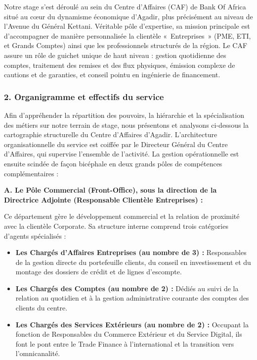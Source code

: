 Notre stage s'est déroulé au sein du Centre d'Affaires (CAF) de Bank Of Africa situé au c\oe{}ur du dynamisme économique d'Agadir, plus précisément au niveau de l'Avenue du Général Kettani. Véritable pôle d'expertise, sa mission principale est d'accompagner de manière personnalisée la clientèle «~Entreprises~» (PME, ETI, et Grands Comptes) ainsi que les professionnels structurés de la région. Le CAF assure un rôle de guichet unique de haut niveau : gestion quotidienne des comptes, traitement des remises et des flux physiques, émission complexe de cautions et de garanties, et conseil pointu en ingénierie de financement.

\subsubsection*{2. Organigramme et effectifs du service}

Afin d'appréhender la répartition des pouvoirs, la hiérarchie et la spécialisation des métiers sur notre terrain de stage, nous présentons et analysons ci-dessous la cartographie structurelle du Centre d'Affaires d'Agadir. L'architecture organisationnelle du service est coiffée par le Directeur Général du Centre d'Affaires, qui supervise l'ensemble de l'activité. La gestion opérationnelle est ensuite scindée de façon bicéphale en deux grands pôles de compétences complémentaires :

\textbf{A. Le Pôle Commercial (Front-Office), sous la direction de la Directrice Adjointe (Responsable Clientèle Entreprises) :}

Ce département gère le développement commercial et la relation de proximité avec la clientèle Corporate. Sa structure interne comprend trois catégories d'agents spécialisés :

\begin{itemize}
  \item \textbf{Les Chargés d'Affaires Entreprises (au nombre de 3) :} Responsables de la gestion directe du portefeuille clients, du conseil en investissement et du montage des dossiers de crédit et de lignes d'escompte.
  \item \textbf{Les Chargés des Comptes (au nombre de 2) :} Dédiés au suivi de la relation au quotidien et à la gestion administrative courante des comptes des clients du centre.
  \item \textbf{Les Chargés des Services Extérieurs (au nombre de 2) :} Occupant la fonction de Responsables du Commerce Extérieur et du Service Digital, ils font le pont entre le Trade Finance à l'international et la transition vers l'omnicanalité.
\end{itemize}

